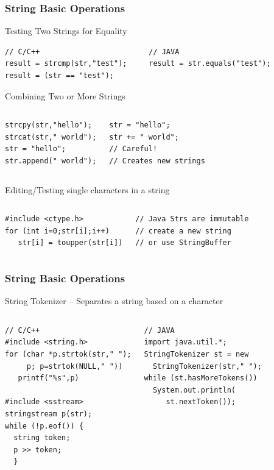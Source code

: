 \begin{frame}[fragile]
  \frametitle{String Basic Operations}
  {\smaller

      \begin{block}{Testing Two Strings for Equality}
\begin{verbatim}
// C/C++                         // JAVA
result = strcmp(str,"test");     result = str.equals("test");
result = (str == "test");
\end{verbatim}
      \end{block}


    \begin{block}{Combining Two or More Strings}
      \begin{columns}
\begin{verbatim}
strcpy(str,"hello");
strcat(str," world");
str = "hello";
str.append(" world");
\end{verbatim}
\begin{verbatim}
str = "hello";
str += " world";
// Careful!
// Creates new strings
\end{verbatim}
      \end{columns}
    \end{block}
    \begin{block}{Editing/Testing single characters in a string}
      \begin{columns}[T]
\begin{verbatim}
#include <ctype.h>
for (int i=0;str[i];i++)
   str[i] = toupper(str[i])
\end{verbatim}
\begin{verbatim}
// Java Strs are immutable
// create a new string
// or use StringBuffer
\end{verbatim}
      \end{columns}
    \end{block}
  }
\end{frame}

\begin{frame}[fragile]
  \frametitle{String Basic Operations}
  {\smaller
    \begin{block}{String Tokenizer -- Separates a string based on a character}
      \begin{columns}[T]
\begin{verbatim}
// C/C++
#include <string.h>
for (char *p.strtok(str," ");
     p; p=strtok(NULL," "))
   printf("%s",p)

#include <sstream>
stringstream p(str);
while (!p.eof()) {
  string token;
  p >> token;
  }
\end{verbatim}
\begin{verbatim}
// JAVA
import java.util.*;
StringTokenizer st = new
  StringTokenizer(str," ");
while (st.hasMoreTokens())
  System.out.println(
     st.nextToken());
\end{verbatim}
      \end{columns}
    \end{block}
    }
\end{frame}

